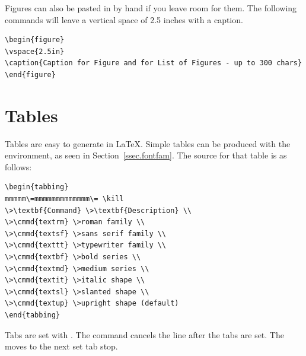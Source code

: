 Figures can also be pasted in by hand if you leave room for them.
The following commands will leave a vertical space of 2.5 inches with a caption.
\begin{verbatim}
\begin{figure}
\vspace{2.5in}
\caption{Caption for Figure and for List of Figures - up to 300 chars}
\end{figure}
\end{verbatim}
\section{Tables}
Tables are easy to generate in \LaTeX .
Simple tables can be produced with the  environment, as seen
in Section~\ref{ssec.fontfam}.
The source for that table is as follows:
\begin{verbatim}
\begin{tabbing}
mmmmm\=mmmmmmmmmmmmm\= \kill
\>\textbf{Command} \>\textbf{Description} \\
\>\cmmd{textrm} \>roman family \\
\>\cmmd{textsf} \>sans serif family \\
\>\cmmd{texttt} \>typewriter family \\
\>\cmmd{textbf} \>bold series \\
\>\cmmd{textmd} \>medium series \\
\>\cmmd{textit} \>italic shape \\
\>\cmmd{textsl} \>slanted shape \\
\>\cmmd{textup} \>upright shape (default)
\end{tabbing}
\end{verbatim}
Tabs are set with \cmmd{=}.
The  command cancels the line after the tabs are set. 
The \cmmd{>} moves to the next set tab stop.

